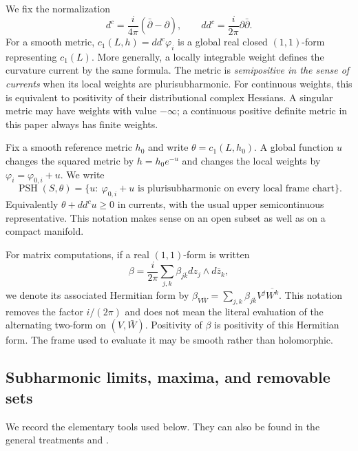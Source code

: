 \documentclass[11pt,a4paper]{article}
\numberwithin{equation}{section}
\theoremstyle{definition}
\theoremstyle{remark}
\newcommand{\ddc}{dd^{c}}
\DeclareMathOperator{\PSH}{PSH}
\begin{document}
We fix the normalization
\[
 d^c=\frac{i}{4\pi}(\bar\partial-\partial),\qquad
 \ddc=\frac{i}{2\pi}\partial\bar\partial.
\]
For a smooth metric, $c_1(L,h)=\ddc\varphi_i$ is a global real closed
$(1,1)$-form representing $c_1(L)$. More generally, a locally integrable
weight defines the curvature current by the same formula. The metric is
\emph{semipositive in the sense of currents} when its local weights are
plurisubharmonic. For continuous weights, this is equivalent to positivity
of their distributional complex Hessians. A singular metric may have
weights with value $-\infty$; a continuous positive definite metric in this
paper always has finite weights.

Fix a smooth reference metric $h_0$ and write
$\theta=c_1(L,h_0)$. A global function $u$ changes the squared metric by
$h=h_0e^{-u}$ and changes the local weights by
$\varphi_i=\varphi_{0,i}+u$. We write
\[
 \PSH(S,\theta)=\{u:\ \varphi_{0,i}+u\text{ is plurisubharmonic
 on every local frame chart}\}.
\]
Equivalently $\theta+\ddc u\ge0$ in currents, with the usual upper
semicontinuous representative. This notation makes sense on an open
subset as well as on a compact manifold.

For matrix computations, if a real $(1,1)$-form is written
\[
 \beta=\frac{i}{2\pi}\sum_{j,k}\beta_{j\bar k}
 dz_j\wedge d\bar z_k,
\]
we denote its associated Hermitian form by
$\beta_{V\bar W}=\sum_{j,k}\beta_{j\bar k}V^j\overline{W^k}$.
This notation removes the factor $i/(2\pi)$ and does not mean the literal
evaluation of the alternating two-form on $(V,\bar W)$. Positivity of
$\beta$ is positivity of this Hermitian form. The frame used to evaluate
it may be smooth rather than holomorphic.

\subsection{Subharmonic limits, maxima, and removable sets}
We record the elementary tools used below. They can also be found in the
general treatments \cite[Chapter~I, \S5]{DemaillyCADG} and
\cite{Demailly2012}.
\end{document}

